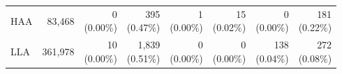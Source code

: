 \begin{table}[htbp]
\begin{tabular}{lrrrrrrr}
  HAA &    83,468 & \makecell{    0 \\ (0.00\%)} & \makecell{   395 \\ (0.47\%)} & \makecell{ 1 \\ (0.00\%)} & \makecell{15 \\ (0.02\%)} & \makecell{     0 \\ (0.00\%)} & \makecell{  181 \\ (0.22\%)} \\ 
  LLA &   361,978 & \makecell{   10 \\ (0.00\%)} & \makecell{ 1,839 \\ (0.51\%)} & \makecell{ 0 \\ (0.00\%)} & \makecell{ 0 \\ (0.00\%)} & \makecell{   138 \\ (0.04\%)} & \makecell{  272 \\ (0.08\%)} \\ 
   \bottomrule
\end{tabular}
\end{table}
